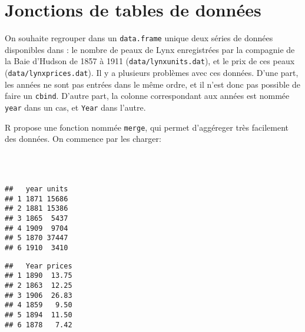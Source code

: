 \section{Jonctions de tables de données}

On souhaite regrouper dans un \texttt{data.frame} unique deux séries de données disponibles dans \textcite{Andrews1985}: le nombre de peaux de Lynx enregistrées par la compagnie de la Baie d'Hudson de 1857 à 1911 (\texttt{data/lynxunits.dat}), et le prix de ces peaux (\texttt{data/lynxprices.dat}). Il y a plusieurs problèmes avec ces données. D'une part, les années ne sont pas entrées dans le même ordre, et il n'est donc pas possible de faire un \texttt{cbind}. D'autre part, la colonne correspondant aux années est nommée \texttt{year} dans un cas, et \texttt{Year} dans l'autre.

R propose une fonction nommée \texttt{merge}, qui permet d'aggéreger très facilement des données. On commence par les charger:

\begin{knitrout}
\color{fgcolor}\begin{kframe}
\begin{flushleft}
\ttfamily\noindent
{}\hlassignement{\usebox{\hlnormalsizeboxlessthan}-}{\ }\hlkeyword{(}\hlkeyword{,}{\ }\hlargument{=}{\ }\hlkeyword{)}\hspace*{\fill}\\
\hlstd{}\hlassignement{\usebox{\hlnormalsizeboxlessthan}-}{\ }\hlkeyword{(}\hlkeyword{,}{\ }\hlargument{=}{\ }\hlkeyword{)}\hspace*{\fill}\\
\hlstd{}\hlkeyword{(}\hlkeyword{)}\mbox{}
\normalfont
\end{flushleft}
\begin{verbatim}
##   year units
## 1 1871 15686
## 2 1881 15386
## 3 1865  5437
## 4 1909  9704
## 5 1870 37447
## 6 1910  3410
\end{verbatim}
\begin{flushleft}
\ttfamily\noindent
{}\hlkeyword{(}\hlkeyword{)}\mbox{}
\normalfont
\end{flushleft}
\begin{verbatim}
##   Year prices
## 1 1890  13.75
## 2 1863  12.25
## 3 1906  26.83
## 4 1859   9.50
## 5 1894  11.50
## 6 1878   7.42
\end{verbatim}
\end{kframe}
\end{knitrout}


